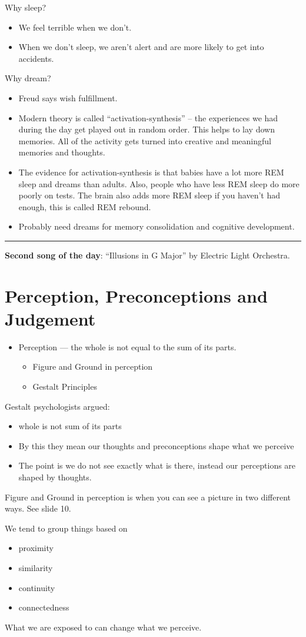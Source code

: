 \documentclass[12pt]{article}
\begin{document}
Why sleep?

\begin{itemize}
	\item We feel terrible when we don't.
	\item When we don't sleep, we aren't alert and are more likely to get into
		accidents.
\end{itemize}

Why dream?

\begin{itemize}
	\item Freud says wish fulfillment.
	\item Modern theory is called ``activation-synthesis'' -- the experiences we
		had during the day get played out in random order. This helps to lay
		down memories. All of the activity gets turned into creative and
		meaningful memories and thoughts.
	\item The evidence for activation-synthesis is that babies have a lot more
		REM sleep and dreams than adults. Also, people who have less REM sleep
		do more poorly on tests. The brain also adds more REM sleep if you
		haven't had enough, this is called REM rebound.
	\item Probably need dreams for memory consolidation and cognitive
		development.
\end{itemize}

\vspace{1cm}
\hrule

\textbf{Second song of the day}: ``Illusions in G Major'' by Electric Light
Orchestra.

\section{Perception, Preconceptions and Judgement}

\begin{itemize}
	\item Perception --- the whole is not equal to the sum of its parts.
		\begin{itemize}
			\item Figure and Ground in perception
			\item Gestalt Principles
		\end{itemize}
\end{itemize}

Gestalt psychologists argued:
\begin{itemize}
	\item whole is not sum of its parts
	\item By this they mean our thoughts and preconceptions shape what we
		perceive
	\item The point is we do not see exactly what is there, instead our
		perceptions are shaped by thoughts.
\end{itemize}

Figure and Ground in perception is when you can see a picture in two different
ways. See slide 10.

We tend to group things based on 
\begin{itemize}
	\item proximity
	\item similarity
	\item continuity
	\item connectedness
\end{itemize}

What we are exposed to can change what we perceive.
\end{document}
